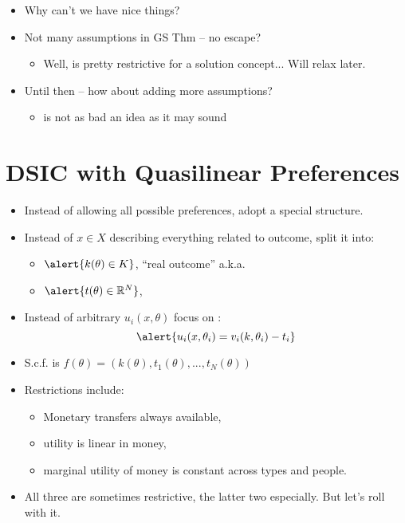 \documentclass[english,handout,10pt]{beamer}		%
\def\lyxframeend{} %
\begin{document}
\begin{itemize}
	\item Why can't we have nice things?
	\item Not many assumptions in GS Thm -- no escape?
	\pause
	\begin{itemize}
		\item Well,  is pretty restrictive for a solution concept... Will relax later.
	\end{itemize}
	\item Until then -- how about adding more assumptions?
	\begin{itemize}
		\item {} is not as bad an idea as it may sound
	\end{itemize}
\end{itemize}
\lyxframeend





\section{DSIC with Quasilinear Preferences}


\begin{itemize}
	\item Instead of allowing all possible preferences, adopt a special structure.
	\item Instead of $x \in X$ describing everything related to outcome, split it into:
	\begin{itemize}
		\item $\alert{k(\theta) \in K}$, ``real outcome'' a.k.a. 
		\item $\alert{t(\theta) \in \mathbb{R}^N}$, 
	\end{itemize}
	\item Instead of arbitrary $u_i(x,\theta)$ focus on :
	$$\alert{ u_i(x,\theta_i) = v_i(k,\theta_i) - t_i }$$
	\pause\vspace{-1em}
	\item S.c.f. is $f(\theta) = \left( k(\theta), t_1(\theta), ..., t_N(\theta) \right)$
\end{itemize}
\lyxframeend


\begin{itemize}
	\item Restrictions include:
	\begin{itemize}
		\item Monetary transfers always available,
		\item utility is linear in money,
		\item marginal utility of money is constant across types and people.
	\end{itemize}
	\item All three are sometimes restrictive, the latter two especially. But let's roll with it.
\end{itemize}
\lyxframeend
\end{document}
